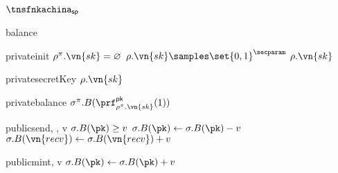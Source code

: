 \begin{transitionfn}{$\tnsfnkachina_{\mathsf{sp}}$}
  \begin{receiveinput}{balance}{}
    \mkpriv
    \State {}
    \mknorm
  \end{receiveinput}
  \vsep
  \mkpriv
  \begin{receivequery}{private}{init}{}
    \State \Assert $\rho^\pi.\vn{sk} = \varnothing$
    \State \Let $\rho.\vn{sk} \samples \set{0, 1}^\secparam$
    \State \Return $\rho.\vn{sk}$
  \end{receivequery}
  \begin{receivequery}{private}{secretKey}{}
    \State \Return $\rho.\vn{sk}$
  \end{receivequery}
  \begin{receivequery}{private}{balance}{}
    \State \Return $\sigma^\pi.B(\prf_{\rho^\pi.\vn{sk}}^{\mathsf{pk}}(1))$
  \end{receivequery}
  \mknorm
  \vsep
  \mkpub
  \begin{receivequery}{public}{send}{\pk, , v}
    \State \Assert $\sigma.B(\pk) \ge v$
    \State \Let $\sigma.B(\pk) \gets \sigma.B(\pk) - v$
    \State \Let $\sigma.B(\vn{recv}) \gets \sigma.B(\vn{recv}) + v$
  \end{receivequery}
  \begin{receivequery}{public}{mint}{\pk, v}
    \State \Let $\sigma.B(\pk) \gets \sigma.B(\pk) + v$
  \end{receivequery}
  \mknorm
\end{transitionfn}
